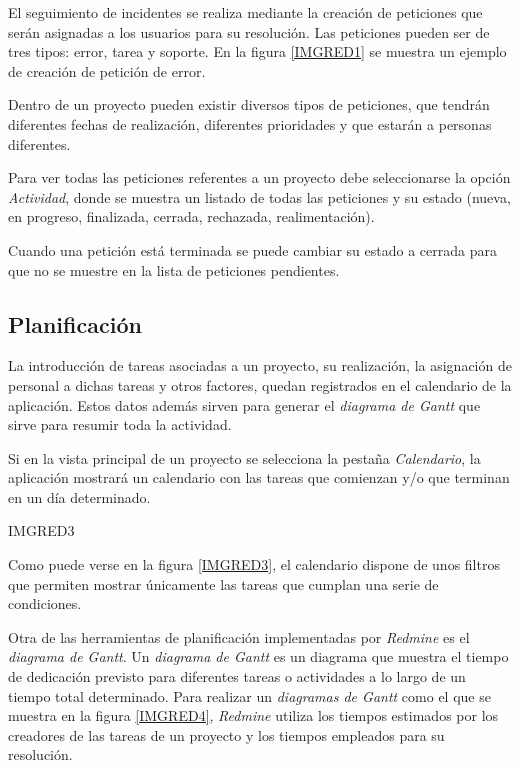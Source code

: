 \documentclass[11pt,a4paper,spanish,twoside]{report}
\begin{document}
        El seguimiento de incidentes se realiza mediante la creación de
        peticiones que serán asignadas a los usuarios para su resolución. Las
        peticiones pueden ser de tres tipos: error, tarea y soporte. En la
        figura \ref{IMGRED1} se muestra un ejemplo de creación de petición de
        error.


        Dentro de un proyecto pueden existir diversos tipos de peticiones,
        que tendrán diferentes fechas de realización, diferentes prioridades
        y que estarán a personas diferentes. 

        Para ver todas las peticiones referentes a un proyecto debe
        seleccionarse la opción \emph{Actividad}, donde se muestra un listado
        de todas las peticiones y su estado (nueva, en progreso, finalizada,
        cerrada, rechazada, realimentación).


        Cuando una petición está terminada se puede cambiar su estado a
        cerrada para que no se muestre en la lista de peticiones pendientes.

	\subsection{Planificación}
	La introducción de tareas asociadas a un proyecto, su realización, la
	asignación de personal a dichas tareas y otros factores, quedan registrados
	en el calendario de la aplicación. Estos datos además sirven para generar
	el \emph{diagrama de Gantt} que sirve para resumir toda la actividad.

	Si en la vista principal de un proyecto se selecciona la pestaña
	\emph{Calendario}, la aplicación mostrará un calendario con las tareas
	que comienzan y/o que terminan en un día determinado.

	{IMGRED3}

	Como puede verse en la figura \ref{IMGRED3}, el calendario dispone de unos
	filtros que permiten mostrar únicamente	las tareas que cumplan una serie de
	condiciones.
	
	Otra de las herramientas de planificación implementadas por \emph{Redmine}
	es el \emph{diagrama de Gantt}. Un \emph{diagrama de Gantt} es un diagrama
	que muestra el tiempo de dedicación previsto para diferentes tareas o
	actividades a lo largo de un tiempo total determinado. Para realizar
	un \emph{diagramas de Gantt} como el que se muestra en la figura
	\ref{IMGRED4}, \emph{Redmine} utiliza los tiempos estimados por los
	creadores de las tareas de un proyecto y los tiempos	empleados para su
	resolución.
\end{document}
